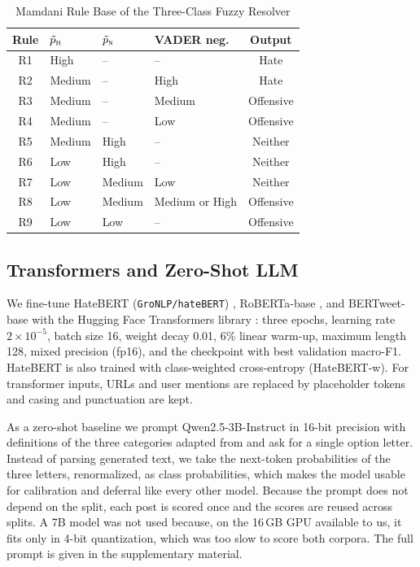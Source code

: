 \documentclass[lettersize,journal]{IEEEtran}
\begin{document}
\begin{table}[t]
\centering
\caption{Mamdani Rule Base of the Three-Class Fuzzy Resolver}
\label{tab:rules}
\begin{tabular}{clllc}
\toprule
Rule & $\tilde{p}_{\textsc{h}}$ & $\tilde{p}_{\textsc{n}}$ & VADER neg. & Output \\
\midrule
R1 & High & -- & -- & Hate \\
R2 & Medium & -- & High & Hate \\
R3 & Medium & -- & Medium & Offensive \\
R4 & Medium & -- & Low & Offensive \\
R5 & Medium & High & -- & Neither \\
R6 & Low & High & -- & Neither \\
R7 & Low & Medium & Low & Neither \\
R8 & Low & Medium & Medium or High & Offensive \\
R9 & Low & Low & -- & Offensive \\
\bottomrule
\end{tabular}
\end{table}

\subsection{Transformers and Zero-Shot LLM}
We fine-tune HateBERT (\texttt{GroNLP/hateBERT}) \cite{caselli2021hatebert}, RoBERTa-base \cite{liu2019roberta}, and BERTweet-base \cite{nguyen2020bertweet} with the Hugging Face Transformers library \cite{wolf2020transformers}: three epochs, learning rate $2\times10^{-5}$, batch size 16, weight decay 0.01, 6\% linear warm-up, maximum length 128, mixed precision (fp16), and the checkpoint with best validation macro-F1. HateBERT is also trained with class-weighted cross-entropy (HateBERT-w). For transformer inputs, URLs and user mentions are replaced by placeholder tokens and casing and punctuation are kept.

As a zero-shot baseline we prompt Qwen2.5-3B-Instruct \cite{qwen2024qwen25} in 16-bit precision with definitions of the three categories adapted from \cite{davidson2017automated} and ask for a single option letter. Instead of parsing generated text, we take the next-token probabilities of the three letters, renormalized, as class probabilities, which makes the model usable for calibration and deferral like every other model. Because the prompt does not depend on the split, each post is scored once and the scores are reused across splits. A 7B model was not used because, on the 16\,GB GPU available to us, it fits only in 4-bit quantization, which was too slow to score both corpora. The full prompt is given in the supplementary material.
\end{document}
